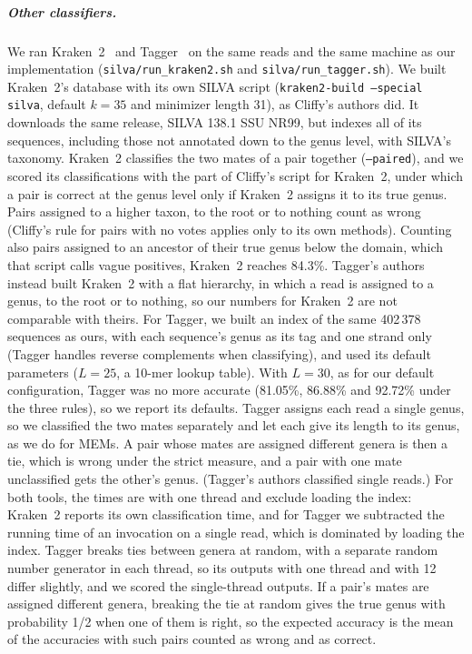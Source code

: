 \subparagraph*{Other classifiers.}
We ran Kraken~2~\cite{WLL19} and Tagger~\cite{DAF+25} on the same reads and the same machine as our implementation (\texttt{silva/run\_kraken2.sh} and \texttt{silva/run\_tagger.sh}).
We built Kraken~2's database with its own SILVA script (\texttt{kraken2-build --special silva}, default $k = 35$ and minimizer length 31), as Cliffy's authors did.
It downloads the same release, SILVA 138.1 SSU NR99, but indexes all of its sequences, including those not annotated down to the genus level, with SILVA's taxonomy.
Kraken~2 classifies the two mates of a pair together (\texttt{--paired}), and we scored its classifications with the part of Cliffy's script for Kraken~2, under which a pair is correct at the genus level only if Kraken~2 assigns it to its true genus.
Pairs assigned to a higher taxon, to the root or to nothing count as wrong (Cliffy's rule for pairs with no votes applies only to its own methods).
Counting also pairs assigned to an ancestor of their true genus below the domain, which that script calls vague positives, Kraken~2 reaches 84.3\%.
Tagger's authors instead built Kraken~2 with a flat hierarchy, in which a read is assigned to a genus, to the root or to nothing, so our numbers for Kraken~2 are not comparable with theirs.
For Tagger, we built an index of the same 402\,378 sequences as ours, with each sequence's genus as its tag and one strand only (Tagger handles reverse complements when classifying), and used its default parameters ($L = 25$, a 10-mer lookup table).
With $L = 30$, as for our default configuration, Tagger was no more accurate (81.05\%, 86.88\% and 92.72\% under the three rules), so we report its defaults.
Tagger assigns each read a single genus, so we classified the two mates separately and let each give its length to its genus, as we do for MEMs.
A pair whose mates are assigned different genera is then a tie, which is wrong under the strict measure, and a pair with one mate unclassified gets the other's genus.
(Tagger's authors classified single reads.)
For both tools, the times are with one thread and exclude loading the index: Kraken~2 reports its own classification time, and for Tagger we subtracted the running time of an invocation on a single read, which is dominated by loading the index.
Tagger breaks ties between genera at random, with a separate random number generator in each thread, so its outputs with one thread and with 12 differ slightly, and we scored the single-thread outputs.
If a pair's mates are assigned different genera, breaking the tie at random gives the true genus with probability 1/2 when one of them is right, so the expected accuracy is the mean of the accuracies with such pairs counted as wrong and as correct.
